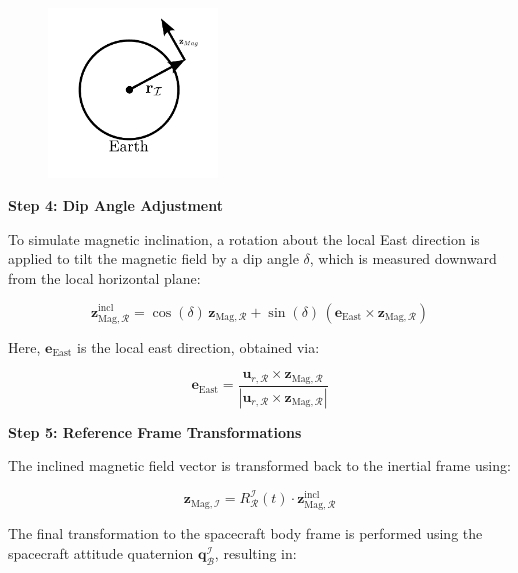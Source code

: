 \begin{figure}[H]
    \centering
    \includegraphics[width=0.4\textwidth]{figures/modelling/Magnetometer.pdf}
    \caption{}
    \label{fig:CSS}
\end{figure}

\textbf{Step 4: Dip Angle Adjustment}

To simulate magnetic inclination, a rotation about the local East direction is applied to tilt the magnetic field by a dip angle $\delta$, which is measured downward from the local horizontal plane:

\begin{equation}
    \mathbf{z}_{\text{Mag},\mathcal{R}}^{\text{incl}} = \cos(\delta)\,\mathbf{z}_{\text{Mag},\mathcal{R}} + \sin(\delta)\,(\mathbf{e}_{\text{East}} \times \mathbf{z}_{\text{Mag},\mathcal{R}})
\end{equation}

Here, $\mathbf{e}_{\text{East}}$ is the local east direction, obtained via:

\begin{equation}
    \mathbf{e}_{\text{East}} = \frac{\mathbf{u}_{r,\mathcal{R}} \times \mathbf{z}_{\text{Mag},\mathcal{R}}}{|\mathbf{u}_{r,\mathcal{R}} \times \mathbf{z}_{\text{Mag},\mathcal{R}}|}
\end{equation}


\textbf{Step 5: Reference Frame Transformations}

The inclined magnetic field vector is transformed back to the inertial frame using:

\begin{equation}
    \mathbf{z}_{\text{Mag},\mathcal{I}} = R_{\mathcal{R}}^{\mathcal{I}}(t) \cdot \mathbf{z}_{\text{Mag},\mathcal{R}}^{\text{incl}}
\end{equation}

The final transformation to the spacecraft body frame is performed using the spacecraft attitude quaternion $\mathbf{q}_{\mathcal{B}}^{\mathcal{I}}$, resulting in:

